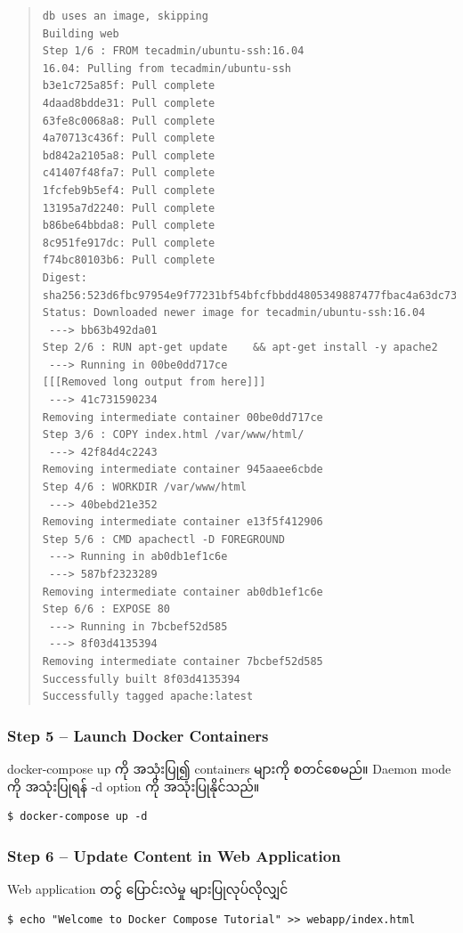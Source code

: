 \documentclass{article}
\begin{document}
\begin{quote}
\begin{verbatim}
db uses an image, skipping
Building web
Step 1/6 : FROM tecadmin/ubuntu-ssh:16.04
16.04: Pulling from tecadmin/ubuntu-ssh
b3e1c725a85f: Pull complete
4daad8bdde31: Pull complete
63fe8c0068a8: Pull complete
4a70713c436f: Pull complete
bd842a2105a8: Pull complete
c41407f48fa7: Pull complete
1fcfeb9b5ef4: Pull complete
13195a7d2240: Pull complete
b86be64bbda8: Pull complete
8c951fe917dc: Pull complete
f74bc80103b6: Pull complete
Digest: sha256:523d6fbc97954e9f77231bf54bfcfbbdd4805349887477fbac4a63dc735d777d
Status: Downloaded newer image for tecadmin/ubuntu-ssh:16.04
 ---> bb63b492da01
Step 2/6 : RUN apt-get update    && apt-get install -y apache2
 ---> Running in 00be0dd717ce
[[[Removed long output from here]]]
 ---> 41c731590234
Removing intermediate container 00be0dd717ce
Step 3/6 : COPY index.html /var/www/html/
 ---> 42f84d4c2243
Removing intermediate container 945aaee6cbde
Step 4/6 : WORKDIR /var/www/html
 ---> 40bebd21e352
Removing intermediate container e13f5f412906
Step 5/6 : CMD apachectl -D FOREGROUND
 ---> Running in ab0db1ef1c6e
 ---> 587bf2323289
Removing intermediate container ab0db1ef1c6e
Step 6/6 : EXPOSE 80
 ---> Running in 7bcbef52d585
 ---> 8f03d4135394
Removing intermediate container 7bcbef52d585
Successfully built 8f03d4135394
Successfully tagged apache:latest
\end{verbatim}
\end{quote}

\subsubsection{Step 5 -- Launch Docker
Containers}\label{step-5-launch-docker-containers}

docker-compose up ကို အသုံးပြု၍ containers များကို စတင်စေမည်။ Daemon
mode ကို အသုံးပြုရန် -d option ကို အသုံးပြုနိုင်သည်။

\begin{verbatim}
$ docker-compose up -d
\end{verbatim}

\subsubsection{Step 6 -- Update Content in Web Application
}\label{step-6-update-content-in-web-application}

Web application တင်ွ ပြောင်းလဲမှု များပြုလုပ်လိုလျှင်

\begin{verbatim}
$ echo "Welcome to Docker Compose Tutorial" >> webapp/index.html
\end{verbatim}
\end{document}

